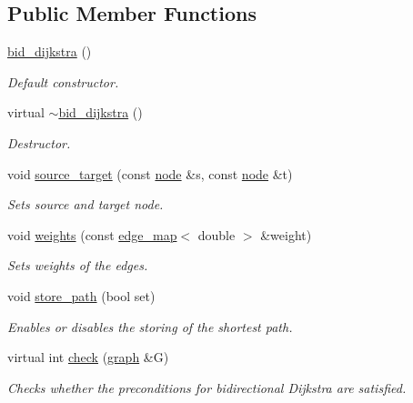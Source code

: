 \subsection*{Public Member Functions}
\begin{DoxyCompactItemize}
\item 
\mbox{\hyperlink{classbid__dijkstra_a1f9ddd95b88b24f45afe0966c2ae181b}{bid\+\_\+dijkstra}} ()
\begin{DoxyCompactList}\small\item\em Default constructor. \end{DoxyCompactList}\item 
virtual \mbox{\hyperlink{classbid__dijkstra_a3d46b327a3a87ac874e3930227a13757}{$\sim$bid\+\_\+dijkstra}} ()
\begin{DoxyCompactList}\small\item\em Destructor. \end{DoxyCompactList}\item 
void \mbox{\hyperlink{classbid__dijkstra_a25dfbd432043e2e642e4dc71f4cb3208}{source\+\_\+target}} (const \mbox{\hyperlink{classnode}{node}} \&s, const \mbox{\hyperlink{classnode}{node}} \&t)
\begin{DoxyCompactList}\small\item\em Sets source and target node. \end{DoxyCompactList}\item 
void \mbox{\hyperlink{classbid__dijkstra_a33dd3a1cc5eb156b56a72235c9140e7d}{weights}} (const \mbox{\hyperlink{classedge__map}{edge\+\_\+map}}$<$ double $>$ \&weight)
\begin{DoxyCompactList}\small\item\em Sets weights of the edges. \end{DoxyCompactList}\item 
void \mbox{\hyperlink{classbid__dijkstra_a0032d9b44c8b3f6f5733ff3ef94cf169}{store\+\_\+path}} (bool set)
\begin{DoxyCompactList}\small\item\em Enables or disables the storing of the shortest path. \end{DoxyCompactList}\item 
virtual int \mbox{\hyperlink{classbid__dijkstra_a504aa04d114f27f2f886ee3b025ad95b}{check}} (\mbox{\hyperlink{classgraph}{graph}} \&G)
\begin{DoxyCompactList}\small\item\em Checks whether the preconditions for bidirectional Dijkstra are satisfied. \end{DoxyCompactList}\item 

\end{DoxyCompactItemize}
